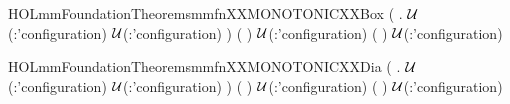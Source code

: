 \newcommand{\HOLmmFoundationTheoremsmmfnXXMONOTONICXXandmm}{\UseVerbatim{HOLmmFoundationTheoremsmmfnXXMONOTONICXXandmm}}
\begin{SaveVerbatim}{HOLmmFoundationTheoremsmmfnXXMONOTONICXXBox}
\HOLTokenTurnstile{} (\HOLSymConst{\HOLTokenForall{}} .
         \HOLSymConst{\HOLTokenImp{}}
         \ensuremath{\cal{U}}(:'configuration)  \HOLConst{\HOLTokenSubset{}}
         \ensuremath{\cal{U}}(:'configuration) ) \HOLSymConst{\HOLTokenImp{}}
      \HOLSymConst{\HOLTokenImp{}}
     (  ) \ensuremath{\cal{U}}(:'configuration)  \HOLConst{\HOLTokenSubset{}}
     (  ) \ensuremath{\cal{U}}(:'configuration) 
\end{SaveVerbatim}
\newcommand{\HOLmmFoundationTheoremsmmfnXXMONOTONICXXBox}{\UseVerbatim{HOLmmFoundationTheoremsmmfnXXMONOTONICXXBox}}
\begin{SaveVerbatim}{HOLmmFoundationTheoremsmmfnXXMONOTONICXXDia}
\HOLTokenTurnstile{} (\HOLSymConst{\HOLTokenForall{}} .
         \HOLSymConst{\HOLTokenImp{}}
         \ensuremath{\cal{U}}(:'configuration)  \HOLConst{\HOLTokenSubset{}}
         \ensuremath{\cal{U}}(:'configuration) ) \HOLSymConst{\HOLTokenImp{}}
      \HOLSymConst{\HOLTokenImp{}}
     (  ) \ensuremath{\cal{U}}(:'configuration)  \HOLConst{\HOLTokenSubset{}}
     (  ) \ensuremath{\cal{U}}(:'configuration) 
\end{SaveVerbatim}
\newcommand{\HOLmmFoundationTheoremsmmfnXXMONOTONICXXDia}{\UseVerbatim{HOLmmFoundationTheoremsmmfnXXMONOTONICXXDia}}
